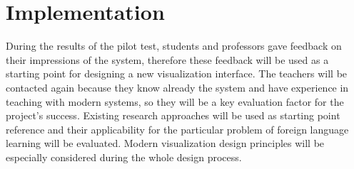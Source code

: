 \chapter{Implementation}\label{ch:implementation}


During the results of the pilot test, students and professors gave feedback on their impressions of the system, therefore these feedback will be used as a starting point for designing a new visualization interface. The teachers will be contacted again because they know already the system and have experience in teaching with modern systems, so they will be a key evaluation factor for the project’s success. 
Existing research approaches will be used as starting point reference and their applicability for the particular problem of foreign language learning will be evaluated. 
Modern visualization design principles will be especially considered during the whole design process.
